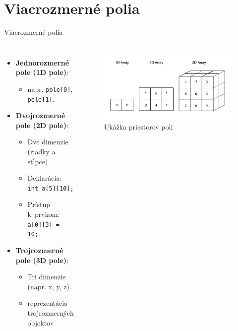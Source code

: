 \documentclass[xcolor=dvipsnames]{beamer}
\begin{document}
\section{Viacrozmerné polia}
\begin{frame}{Viacrozmerné polia}
\begin{columns}
    \begin{itemize}
    \item \textbf{Jednorozmerné pole (1D pole)}:
        \begin{itemize}
            \item napr. \texttt{pole[0]}, \texttt{pole[1]}.
        \end{itemize}
    \item \textbf{Dvojrozmerné pole (2D pole)}:
        \begin{itemize}
            \item Dve dimenzie (riadky a stĺpce).
            \item Deklarácia: \texttt{int a[5][10];}
            \item Prístup k~prvkom: \texttt{a[0][3] = 10;}.
        \end{itemize}
    \item \textbf{Trojrozmerné pole (3D pole)}:
        \begin{itemize}
            \item Tri dimenzie (napr. x, y, z).
            \item reprezentácia trojrozmerných objektov
        \end{itemize}
\end{itemize}
\begin{figure}
    \centering
    \includegraphics[width=1\linewidth]{latexprez2.jpg}
    \caption{Ukážka priestorov polí \footnotemark}
    \label{fig:1_2_3D_arr_example}
\end{figure}
\end{columns}
\end{frame}
\end{document}
